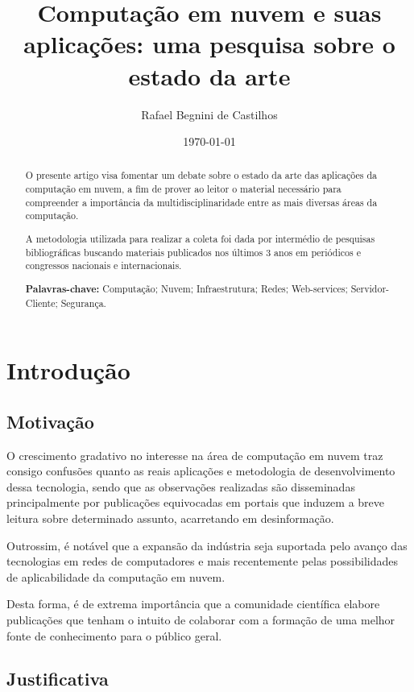 \documentclass[12pt]{article}
\author{Rafael Begnini de Castilhos}
\title{Computação em nuvem e suas aplicações: uma pesquisa sobre o estado da arte}
\date{\today}
\begin{document}
\maketitle

\begin{abstract}
O presente artigo visa fomentar um debate sobre o estado da arte das aplicações da computação em nuvem, a fim de prover ao leitor o material necessário para compreender a importância da multidisciplinaridade entre as mais diversas áreas da computação.

A metodologia utilizada para realizar a coleta foi dada por intermédio de pesquisas bibliográficas buscando materiais publicados nos últimos 3 anos em periódicos e congressos nacionais e internacionais.

\textbf{Palavras-chave:} Computação; Nuvem; Infraestrutura; Redes; Web-services; Servidor-Cliente; Segurança.

\end{abstract}

\section{Introdução}

\subsection{Motivação}

O crescimento gradativo no interesse na área de computação em nuvem traz consigo confusões quanto as reais aplicações e metodologia de desenvolvimento dessa tecnologia, sendo que as observações realizadas são disseminadas principalmente por publicações equivocadas em portais que induzem a breve leitura sobre determinado assunto, acarretando em desinformação. 

Outrossim, é notável que a expansão da indústria seja suportada pelo avanço das tecnologias em redes de computadores e mais recentemente pelas possibilidades de aplicabilidade da computação em nuvem.

Desta forma, é de extrema importância que a comunidade científica elabore publicações que tenham o intuito de colaborar com a formação de uma melhor fonte de conhecimento para o público geral.

\subsection{Justificativa}
\end{document}
